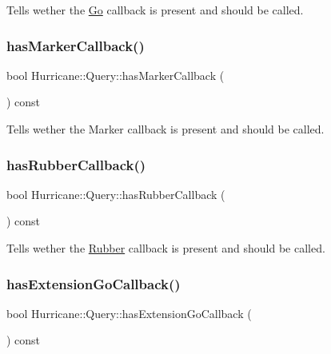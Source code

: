 Tells wether the \hyperlink{classHurricane_1_1Go}{Go} callback is present and should be called. \mbox{\label{classHurricane_1_1Query_a4f121b05f722a661b88bb8a0dc981024}} 
\subsubsection{\texorpdfstring{has\+Marker\+Callback()}{hasMarkerCallback()}}
{\footnotesize\ttfamily bool Hurricane\+::\+Query\+::has\+Marker\+Callback (\begin{DoxyParamCaption}{ }\end{DoxyParamCaption}) const\hspace{0.3cm}{\ttfamily [virtual]}}

Tells wether the Marker callback is present and should be called. \mbox{\label{classHurricane_1_1Query_a5d49250d46dea1542bc3034f3eb1daee}} 
\subsubsection{\texorpdfstring{has\+Rubber\+Callback()}{hasRubberCallback()}}
{\footnotesize\ttfamily bool Hurricane\+::\+Query\+::has\+Rubber\+Callback (\begin{DoxyParamCaption}{ }\end{DoxyParamCaption}) const\hspace{0.3cm}{\ttfamily [virtual]}}

Tells wether the \hyperlink{classHurricane_1_1Rubber}{Rubber} callback is present and should be called. \mbox{\label{classHurricane_1_1Query_abd8ff8d187e4499e625feb12c68e9b29}} 
\subsubsection{\texorpdfstring{has\+Extension\+Go\+Callback()}{hasExtensionGoCallback()}}
{\footnotesize\ttfamily bool Hurricane\+::\+Query\+::has\+Extension\+Go\+Callback (\begin{DoxyParamCaption}{ }\end{DoxyParamCaption}) const\hspace{0.3cm}{\ttfamily [virtual]}}

